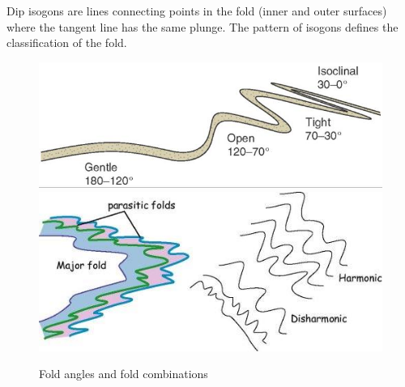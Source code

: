 \documentclass[12pt,a4paper]{report}
\begin{document}
Dip isogons are lines connecting points in the fold (inner and outer surfaces) where the tangent line has the same plunge.
The pattern of isogons defines the classification of the fold.\\
\begin{figure}[h]
  \includegraphics[scale=0.30]{fold-angles.jpg}
  \includegraphics[scale=0.40]{fold-multiple.jpg}
  \centering
  \caption{Fold angles and fold combinations}
\end{figure}
\end{document}
